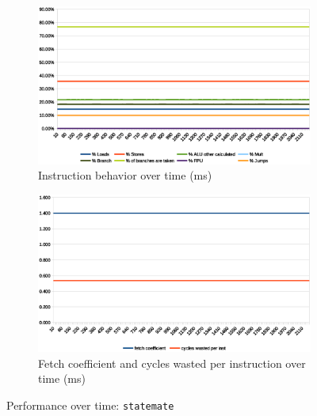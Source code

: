 \documentclass[../bachelor_paper.tex]{subfiles}
\begin{document}
\begin{figure}
    \begin{subfigure}{0.45\textwidth}
        \includegraphics[width=\textwidth]{img/graph/embench/statemate_inst.eps}
        \caption{Instruction behavior over time (ms)}
    \end{subfigure}
    \begin{subfigure}{0.45\textwidth}
        \includegraphics[width=\textwidth]{img/graph/embench/statemate_fetch_waste.eps}
        \caption{Fetch coefficient and cycles wasted per instruction over time (ms)}
    \end{subfigure}
    \caption{Performance over time: \texttt{statemate}}
\end{figure}
\end{document}
